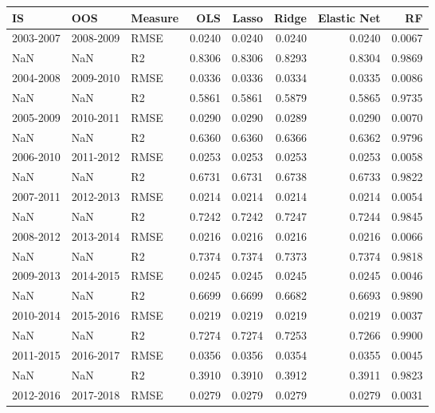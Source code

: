 \begin{tabular}{lllrrrrr}
\toprule
        IS &        OOS & Measure &     OLS &   Lasso &   Ridge &  Elastic Net &      RF \\
\midrule
 2003-2007 &  2008-2009 &    RMSE &  0.0240 &  0.0240 &  0.0240 &       0.0240 &  0.0067 \\
       NaN &        NaN &      R2 &  0.8306 &  0.8306 &  0.8293 &       0.8304 &  0.9869 \\
 2004-2008 &  2009-2010 &    RMSE &  0.0336 &  0.0336 &  0.0334 &       0.0335 &  0.0086 \\
       NaN &        NaN &      R2 &  0.5861 &  0.5861 &  0.5879 &       0.5865 &  0.9735 \\
 2005-2009 &  2010-2011 &    RMSE &  0.0290 &  0.0290 &  0.0289 &       0.0290 &  0.0070 \\
       NaN &        NaN &      R2 &  0.6360 &  0.6360 &  0.6366 &       0.6362 &  0.9796 \\
 2006-2010 &  2011-2012 &    RMSE &  0.0253 &  0.0253 &  0.0253 &       0.0253 &  0.0058 \\
       NaN &        NaN &      R2 &  0.6731 &  0.6731 &  0.6738 &       0.6733 &  0.9822 \\
 2007-2011 &  2012-2013 &    RMSE &  0.0214 &  0.0214 &  0.0214 &       0.0214 &  0.0054 \\
       NaN &        NaN &      R2 &  0.7242 &  0.7242 &  0.7247 &       0.7244 &  0.9845 \\
 2008-2012 &  2013-2014 &    RMSE &  0.0216 &  0.0216 &  0.0216 &       0.0216 &  0.0066 \\
       NaN &        NaN &      R2 &  0.7374 &  0.7374 &  0.7373 &       0.7374 &  0.9818 \\
 2009-2013 &  2014-2015 &    RMSE &  0.0245 &  0.0245 &  0.0245 &       0.0245 &  0.0046 \\
       NaN &        NaN &      R2 &  0.6699 &  0.6699 &  0.6682 &       0.6693 &  0.9890 \\
 2010-2014 &  2015-2016 &    RMSE &  0.0219 &  0.0219 &  0.0219 &       0.0219 &  0.0037 \\
       NaN &        NaN &      R2 &  0.7274 &  0.7274 &  0.7253 &       0.7266 &  0.9900 \\
 2011-2015 &  2016-2017 &    RMSE &  0.0356 &  0.0356 &  0.0354 &       0.0355 &  0.0045 \\
       NaN &        NaN &      R2 &  0.3910 &  0.3910 &  0.3912 &       0.3911 &  0.9823 \\
 2012-2016 &  2017-2018 &    RMSE &  0.0279 &  0.0279 &  0.0279 &       0.0279 &  0.0031 \\

\end{tabular}
